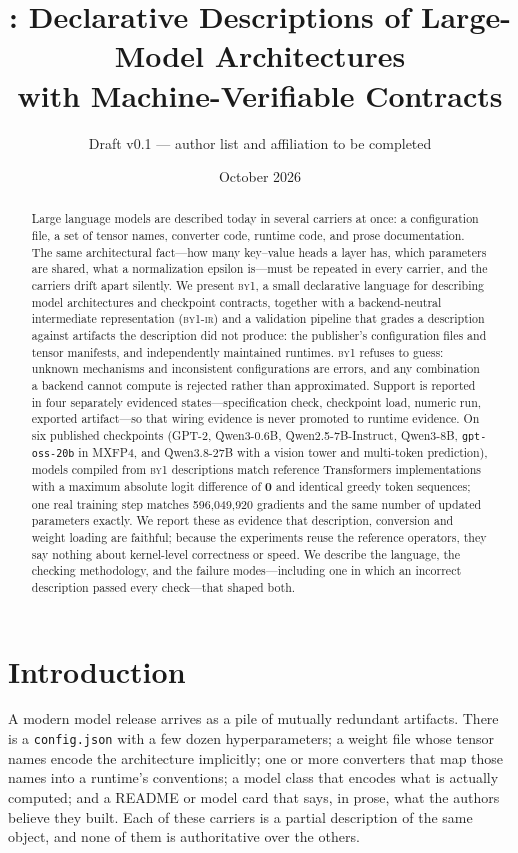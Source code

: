 \documentclass[11pt,a4paper]{article}
\title{\byone{}: Declarative Descriptions of Large-Model Architectures\\
       with Machine-Verifiable Contracts}
\author{Draft v0.1 --- author list and affiliation to be completed}
\date{October 2026}
\newcommand{\code}[1]{\texttt{#1}}
\newcommand{\byone}{\textsc{by1}}
\newcommand{\ir}{\textsc{by1-ir}}
\begin{document}
\maketitle

\begin{abstract}
Large language models are described today in several carriers at once: a
configuration file, a set of tensor names, converter code, runtime code, and
prose documentation. The same architectural fact---how many key--value heads a
layer has, which parameters are shared, what a normalization epsilon is---must
be repeated in every carrier, and the carriers drift apart silently. We present
\byone{}, a small declarative language for describing model architectures and
checkpoint contracts, together with a backend-neutral intermediate
representation (\ir{}) and a validation pipeline that grades a description
against artifacts the description did not produce: the publisher's
configuration files and tensor manifests, and independently maintained
runtimes. \byone{} refuses to guess: unknown mechanisms and inconsistent
configurations are errors, and any combination a backend cannot compute is
rejected rather than approximated. Support is reported in four separately
evidenced states---specification check, checkpoint load, numeric run, exported
artifact---so that wiring evidence is never promoted to runtime evidence. On
six published checkpoints (GPT-2, Qwen3-0.6B, Qwen2.5-7B-Instruct, Qwen3-8B,
\code{gpt-oss-20b} in MXFP4, and Qwen3.8-27B with a vision tower and multi-token
prediction), models compiled from \byone{} descriptions match reference
Transformers implementations with a maximum absolute logit difference of
\textbf{0} and identical greedy token sequences; one real training step matches
596{,}049{,}920 gradients and the same number of updated parameters exactly. We
report these as evidence that description, conversion and weight loading are
faithful; because the experiments reuse the reference operators, they say
nothing about kernel-level correctness or speed. We describe the language, the
checking methodology, and the failure modes---including one in which an
incorrect description passed every check---that shaped both.
\end{abstract}

\section{Introduction}

A modern model release arrives as a pile of mutually redundant artifacts. There
is a \code{config.json} with a few dozen hyperparameters; a weight file whose
tensor names encode the architecture implicitly; one or more converters that
map those names into a runtime's conventions; a model class that encodes what
is actually computed; and a README or model card that says, in prose, what the
authors believe they built. Each of these carriers is a partial description of
the same object, and none of them is authoritative over the others.
\end{document}
